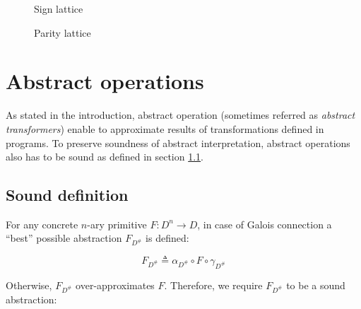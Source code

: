 \documentclass[12pt,oneside]{fithesis2}
\theoremstyle{definition}
\begin{document}
\begin{figure}[ht!]
  \centering
  \caption{Sign lattice}
\end{figure}

\begin{figure}[ht!]
  \centering
  \caption{Parity lattice}
\end{figure}

\section{Abstract operations}\label{sec:operations}

As stated in the introduction, abstract operation (sometimes referred as \textit{abstract transformers}) enable to approximate results of transformations defined in programs. To preserve soundness of abstract interpretation, abstract operations also has to be sound as defined in section \ref{sec:operations-soundness}.

\subsection{Sound definition}\label{sec:operations-soundness}

For any concrete $n$-ary primitive $F: D^n \to D$, in case of Galois connection a ``best'' possible abstraction $F_{D^\#}$ is defined: \cite{mine-AIAA10}

\[
  F_{D^\#} \triangleq \alpha_{D^\#} \circ F \circ \gamma_{D^\#}
\]

Otherwise, $F_{D^\#}$ over-approximates $F$. Therefore, we require $F_{D^\#}$ to be a sound abstraction: \cite{CousotEtAl06-ASIAN}
\end{document}
